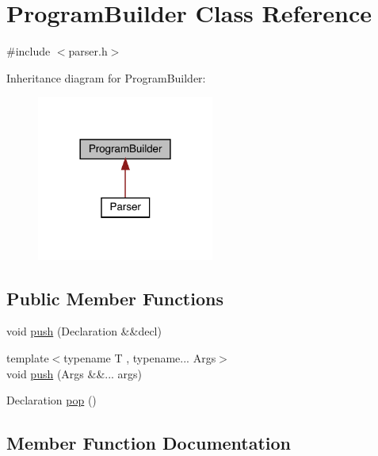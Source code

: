 \hypertarget{class_program_builder}{}\section{Program\+Builder Class Reference}
\label{class_program_builder}


{\ttfamily \#include $<$parser.\+h$>$}



Inheritance diagram for Program\+Builder\+:\nopagebreak
\begin{figure}[H]
\begin{center}
\leavevmode
\includegraphics[width=165pt]{class_program_builder__inherit__graph}
\end{center}
\end{figure}
\subsection*{Public Member Functions}
\begin{DoxyCompactItemize}
\item 
void \hyperlink{class_program_builder_af708c9a72c89ea33d5568326e2a67d68}{push} (Declaration \&\&decl)
\item 
{\footnotesize template$<$typename T , typename... Args$>$ }\\void \hyperlink{class_program_builder_a31d6f57c8b035f32713097e24d6c61a1}{push} (Args \&\&... args)
\item 
Declaration \hyperlink{class_program_builder_a66ed91adcd2d8fcb9124871603e5e85d}{pop} ()
\end{DoxyCompactItemize}


\subsection{Member Function Documentation}
\mbox{\label{class_program_builder_a66ed91adcd2d8fcb9124871603e5e85d}} 
